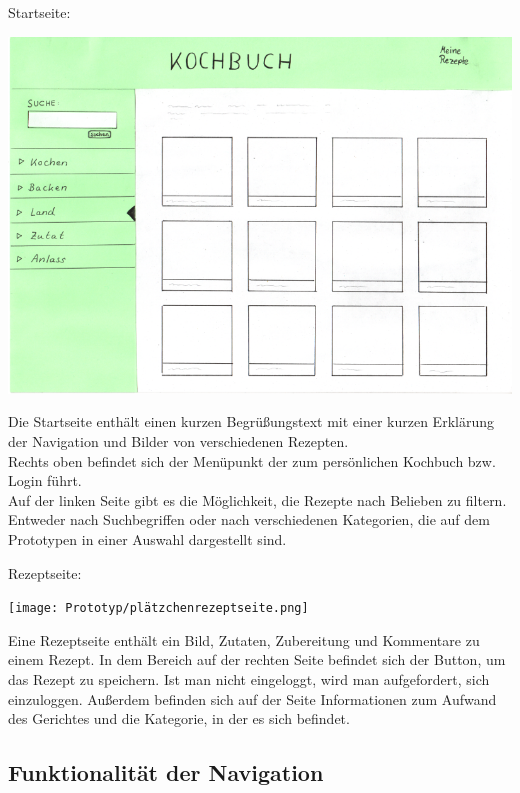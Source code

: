\documentclass[parskip,10pt,abstracton]{scrartcl}
\begin{document}
Startseite:
\begin{center}
\includegraphics[scale=0.4]{Prototyp/home.png}
\end{center}

Die Startseite enthält einen kurzen Begrüßungstext mit einer kurzen Erklärung der Navigation und Bilder von verschiedenen Rezepten.\\
Rechts oben befindet sich der Menüpunkt der zum persönlichen Kochbuch bzw. Login führt.\\
Auf der linken Seite gibt es die Möglichkeit, die Rezepte nach Belieben zu filtern. Entweder nach Suchbegriffen oder nach verschiedenen Kategorien, die auf dem Prototypen in einer Auswahl dargestellt sind.

\pagebreak
Rezeptseite:
\begin{center}
\texttt{[image: Prototyp/plätzchenrezeptseite.png]}
\end{center}

Eine Rezeptseite enthält ein Bild, Zutaten, Zubereitung und Kommentare zu einem Rezept. In dem Bereich auf der rechten Seite befindet sich der Button, um das Rezept zu speichern. Ist man nicht eingeloggt, wird man aufgefordert, sich einzuloggen. 
Außerdem befinden sich auf der Seite Informationen zum Aufwand des Gerichtes und die Kategorie, in der es sich befindet. 

\pagebreak
\subsection*{Funktionalität der Navigation}
\end{document}
